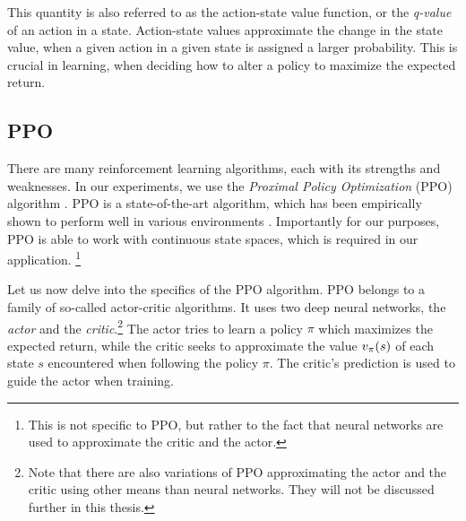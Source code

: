 This quantity is also referred to as the action-state value function, or the \emph{q-value} of an action in a state.
Action-state values approximate the change in the state value, when a given action in a given state is assigned a larger probability.
This is crucial in learning, when deciding how to alter a policy to maximize the expected return.

\subsection{PPO}
\label{sec:prel-ppo}

There are many reinforcement learning algorithms, each with its strengths and weaknesses.
In our experiments, we use the \emph{Proximal Policy Optimization} (PPO) algorithm \citep{schulman2017proximal}.
PPO is a state-of-the-art algorithm, which has been empirically shown to perform well in various environments \citep{conf/nips/Ouyang0JAWMZASR22,Berner2019Dota2W,conf/iclr/BakerKMWPMM20}.
Importantly for our purposes, PPO is able to work with continuous state spaces, which is required in our application.%
\footnote{This is not specific to PPO, but rather to the fact that neural networks are used to approximate the critic and the actor.}

Let us now delve into the specifics of the PPO algorithm.
PPO belongs to a family of so-called actor-critic algorithms.
It uses two deep neural networks, the \emph{actor} and the \emph{critic}.\footnote{Note that there are also variations of PPO approximating the actor and the critic using other means than neural networks.
They will not be discussed further in this thesis.}
The actor tries to learn a policy $ \pi $ which maximizes the expected return,
while the critic seeks to approximate the value $ v_{\pi}\!\left(s\right) $ of each state $ s $ encountered when following the policy $\pi$.
The critic's prediction is used to guide the actor when training.

